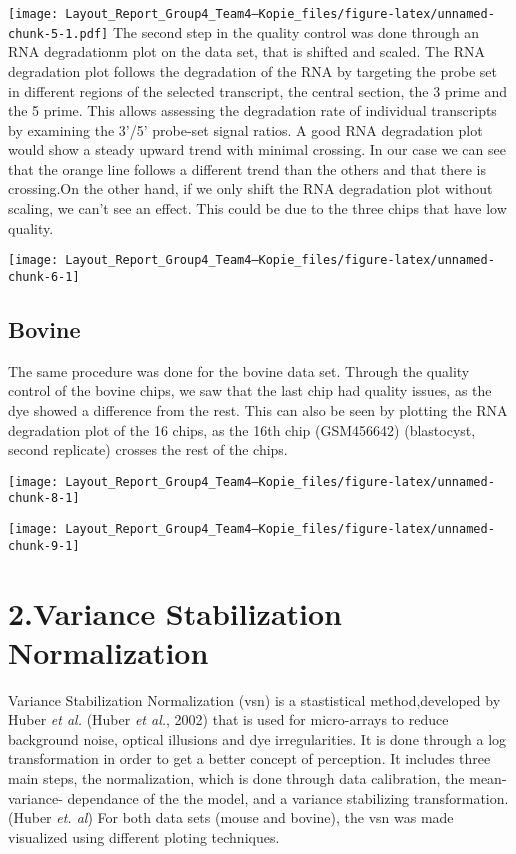 \documentclass[
  parskip,
  oneside]{scrreprt}
\begin{document}
\texttt{[image: Layout\_Report\_Group4\_Team4---Kopie\_files/figure-latex/unnamed-chunk-5-1.pdf]}
The second step in the quality control was done through an RNA
degradationm plot on the data set, that is shifted and scaled. The RNA
degradation plot follows the degradation of the RNA by targeting the
probe set in different regions of the selected transcript, the central
section, the 3 prime and the 5 prime. This allows assessing the
degradation rate of individual transcripts by examining the 3'/5'
probe-set signal ratios. A good RNA degradation plot would show a steady
upward trend with minimal crossing. In our case we can see that the
orange line follows a different trend than the others and that there is
crossing.On the other hand, if we only shift the RNA degradation plot
without scaling, we can't see an effect. This could be due to the three
chips that have low quality.

\texttt{[image: Layout\_Report\_Group4\_Team4---Kopie\_files/figure-latex/unnamed-chunk-6-1]}

\hypertarget{bovine}{%
\subsection{Bovine}\label{bovine}}

The same procedure was done for the bovine data set. Through the quality
control of the bovine chips, we saw that the last chip had quality
issues, as the dye showed a difference from the rest. This can also be
seen by plotting the RNA degradation plot of the 16 chips, as the 16th
chip (GSM456642) (blastocyst, second replicate) crosses the rest of the
chips.

\texttt{[image: Layout\_Report\_Group4\_Team4---Kopie\_files/figure-latex/unnamed-chunk-8-1]}

\texttt{[image: Layout\_Report\_Group4\_Team4---Kopie\_files/figure-latex/unnamed-chunk-9-1]}

\hypertarget{variance-stabilization-normalization}{%
\section{2.Variance Stabilization
Normalization}\label{variance-stabilization-normalization}}

Variance Stabilization Normalization (vsn) is a stastistical
method,developed by Huber \emph{et al.} (Huber \emph{et al.}, 2002) that
is used for micro-arrays to reduce background noise, optical illusions
and dye irregularities. It is done through a log transformation in order
to get a better concept of perception. It includes three main steps, the
normalization, which is done through data calibration, the mean-
variance- dependance of the the model, and a variance stabilizing
transformation. (Huber \emph{et. al}) For both data sets (mouse and
bovine), the vsn was made visualized using different ploting techniques.
\end{document}
